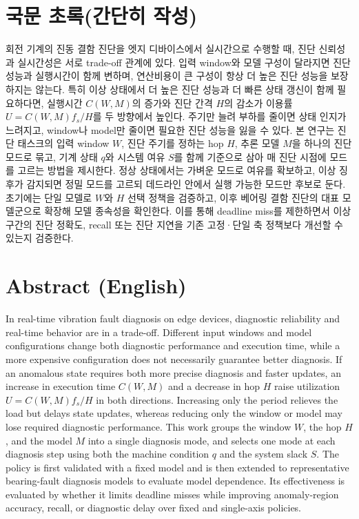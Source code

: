 \documentclass[10pt]{article}
\begin{document}
\section{국문 초록(간단히 작성)}
회전 기계의 진동 결함 진단을 엣지 디바이스에서 실시간으로 수행할 때, 진단 신뢰성과 실시간성은 서로 trade-off 관계에 있다. 입력 window와 모델 구성이 달라지면 진단 성능과 실행시간이 함께 변하며, 연산비용이 큰 구성이 항상 더 높은 진단 성능을 보장하지는 않는다. 특히 이상 상태에서 더 높은 진단 성능과 더 빠른 상태 갱신이 함께 필요하다면, 실행시간 $C(W,M)$의 증가와 진단 간격 $H$의 감소가 이용률 $U=C(W,M)f_s/H$를 두 방향에서 높인다. 주기만 늘려 부하를 줄이면 상태 인지가 느려지고, window나 model만 줄이면 필요한 진단 성능을 잃을 수 있다. 본 연구는 진단 태스크의 입력 window $W$, 진단 주기를 정하는 hop $H$, 추론 모델 $M$을 하나의 진단 모드로 묶고, 기계 상태 $q$와 시스템 여유 $S$를 함께 기준으로 삼아 매 진단 시점에 모드를 고르는 방법을 제시한다. 정상 상태에서는 가벼운 모드로 여유를 확보하고, 이상 징후가 감지되면 정밀 모드를 고르되 데드라인 안에서 실행 가능한 모드만 후보로 둔다. 초기에는 단일 모델로 $W$와 $H$ 선택 정책을 검증하고, 이후 베어링 결함 진단의 대표 모델군으로 확장해 모델 종속성을 확인한다. 이를 통해 deadline miss를 제한하면서 이상 구간의 진단 정확도, recall 또는 진단 지연을 기존 고정·단일 축 정책보다 개선할 수 있는지 검증한다.

\section{Abstract (English)}
In real-time vibration fault diagnosis on edge devices, diagnostic reliability and real-time behavior are in a trade-off. Different input windows and model configurations change both diagnostic performance and execution time, while a more expensive configuration does not necessarily guarantee better diagnosis. If an anomalous state requires both more precise diagnosis and faster updates, an increase in execution time $C(W,M)$ and a decrease in hop $H$ raise utilization $U=C(W,M)f_s/H$ in both directions. Increasing only the period relieves the load but delays state updates, whereas reducing only the window or model may lose required diagnostic performance. This work groups the window $W$, the hop $H$, and the model $M$ into a single diagnosis mode, and selects one mode at each diagnosis step using both the machine condition $q$ and the system slack $S$. The policy is first validated with a fixed model and is then extended to representative bearing-fault diagnosis models to evaluate model dependence. Its effectiveness is evaluated by whether it limits deadline misses while improving anomaly-region accuracy, recall, or diagnostic delay over fixed and single-axis policies.
\end{document}
